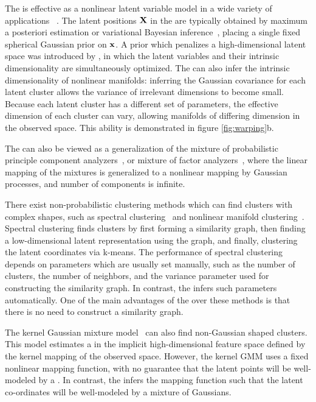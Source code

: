 The \gplvm{} is effective as a nonlinear latent variable model in a wide variety of applications ~\citep{lawrence2004gaussian,salzmann2008local,lawrence2009non}.
The latent positions $\mathbf{X}$ in the \gplvm{} are typically obtained by maximum a posteriori estimation or variational Bayesian inference~\citep{titsias2010bayesian}, placing a single fixed spherical Gaussian prior on ${\bf{x}}$.
A prior which penalizes a high-dimensional latent space was introduced by \citet{geiger2009rank}, in which the latent variables and their intrinsic dimensionality are simultaneously optimized.
The \iwmm{} can also infer the intrinsic dimensionality of nonlinear manifolds:
inferring the Gaussian covariance for each latent cluster allows the variance of irrelevant dimensions to become small.  
Because each latent cluster has a different set of parameters, the effective dimension of each cluster can vary, allowing manifolds of differing dimension in the observed space.
This ability is demonstrated in figure \ref{fig:warping}b.

The \iwmm{} can also be viewed as a generalization of the mixture of probabilistic principle component analyzers~\citep{tipping1999mixtures}, or mixture of factor analyzers~\citep{ghahramani2000variational}, where the linear mapping of the mixtures is generalized to a nonlinear mapping by Gaussian processes, and number of components is infinite.%

There exist non-probabilistic clustering methods which can find clusters with complex shapes, such as spectral clustering~\citep{ng2002spectral} and nonlinear manifold clustering~\citep{cao2006nonlinear,elhamifar2011sparse}.
Spectral clustering finds clusters by first forming a similarity graph, then finding a low-dimensional latent representation using the graph, and finally, clustering the latent coordinates via k-means.
The performance of spectral clustering depends on parameters which are usually set manually, such as the number of clusters, the number of neighbors, and the variance parameter used for constructing the similarity graph.
In contrast, the \iwmm{} infers such parameters automatically.
One of the main advantages of the \iwmm{} over these methods is that there is no need to construct a similarity graph.

The kernel Gaussian mixture model~\citep{wang2003kernel} can also find non-Gaussian shaped clusters.
This model estimates a \GMM{} in the implicit high-dimensional feature space defined by the kernel mapping of the observed space.
However, the kernel GMM uses a fixed nonlinear mapping function, with no guarantee that the latent points will be well-modeled by a \GMM{}.
In contrast, the \iwmm{} infers the mapping function such that the latent co-ordinates will be well-modeled by a mixture of Gaussians.

